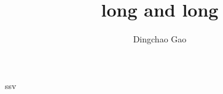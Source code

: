 \documentclass[18 pt]{beamer}
\title[short]{long and long}
\author[Gcc]{Dingchao Gao}
\institute[ISCAS]{Institute of Software Chinese Academy of Sciences}
\begin{document}
\begin{frame}[plain]
  \titlepage
\end{frame}


\begin{frame}
  ssv
\end{frame}
\end{document}
